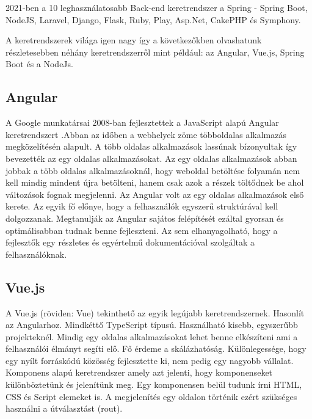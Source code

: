 2021-ben a 10 leghasználatosabb Back-end keretrendszer a Spring - Spring Boot, NodeJS, Laravel, Django, Flask, Ruby, Play, Asp.Net, CakePHP és Symphony.\cite{backendframework1}\cite{backendframework2} 

A keretrendszerek világa igen nagy így a következőkben olvashatunk részletesebben néhány keretrendszerről mint például: az Angular, Vue.js, Spring Boot és a NodeJs.

\subsection{Angular}
A Google munkatársai 2008-ban fejlesztettek a JavaScript alapú Angular keretrendszert \cite{wohlgethan2018supportingweb}.Abban az időben a webhelyek zöme többoldalas alkalmazás megközelítésén alapult. A több oldalas alkalmazások lassúnak bízonyultak így bevezették az egy oldalas alkalmazásokat. Az egy oldalas alkalmazások abban jobbak a több oldalas alkalmazásoknál, hogy weboldal betöltése folyamán nem kell mindig mindent újra betölteni, hanem csak azok a részek töltődnek be ahol változások fognak megjelenni. Az Angular volt az egy oldalas alkalmazások első kerete. Az egyik fő előnye, hogy a felhasználók egyszerű struktúrával kell dolgozzanak. Megtanulják az Angular sajátos felépítését ezáltal gyorsan és optimálisabban tudnak benne fejleszteni. Az sem elhanyagolható, hogy a fejlesztők egy részletes és egyértelmű dokumentációval szolgáltak a felhasználóknak.

\subsection{Vue.js}
A Vue.js (röviden: Vue) \cite{wohlgethan2018supportingweb} tekinthető az egyik legújabb keretrendszernek. Hasonlít az Angularhoz. Mindkéttő TypeScript típusú. Használható kisebb, egyszerűbb projekteknél. Mindig egy oldalas alkalmazásokat lehet benne elkészíteni ami a felhasználói élmányt segíti elő. Fő érdeme a skálázhatóság. Különlegessége, hogy egy nyílt forráskódú közösség fejlesztette ki, nem pedig egy nagyobb vállalat. Komponens alapú keretrendszer amely azt jelenti, hogy komponenseket különböztetünk és jelenítünk meg. Egy komponensen belül tudunk írni HTML, CSS és Script elemeket is. A megjelenítés egy oldalon történik ezért szükséges használni a útválasztást (rout).
	
